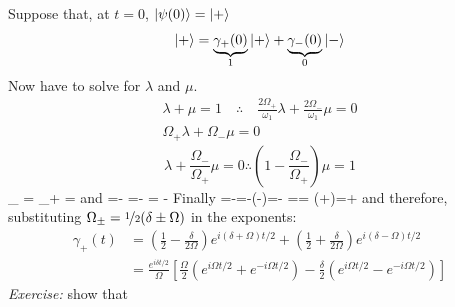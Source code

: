\documentclass[12pt]{article}
\begin{document}
Suppose that, at $t=0$, $\ket{\psi(0)} = \ket{+}$
\[
\ket{+}=
\underbrace{\gamma_+(0)}_{1} \ket{+}+ 
\underbrace{\gamma_-(0)}_{0} \ket{-} 
\]
Now have to solve for $\lambda$ and $\mu$.
\[
\begin{gathered}
\lambda+\mu=1 \quad \therefore \quad \frac{2 \Omega_{+}}{\omega_{1}} \lambda+\frac{2 \Omega_-}{\omega_{1}} \mu=0\\
\Omega_+\lambda+\Omega_-\mu=0
\end{gathered}
\]
\[
\lambda+\frac{\Omega_{-}}{\Omega_{+}} \mu=0 
\therefore\left(1-\frac{\Omega_{-}}{\Omega_{+}}\right) \mu=1
\]
\be
\underbrace{(\Omega_{+} - \Omega_{-})}%
_{\Omega}
\mu = \Omega_{+}
\therefore
\mu = \frac{\Omega_{+}}{\Omega}
\ee
and
\be
\lambda=-\frac{\Omega_{-}}{\Omega_{+}} \mu=-\frac{\Omega_{-}}{\Omega_{+}} \frac{\Omega_{+}}{\Omega}=
- \frac{\Omega_{-}}{\Omega}
\ee
Finally
\be
\lambda=-\frac{\Omega_{-}}{\Omega}=-(\delta-\Omega)=-\frac{\delta}{2 \Omega}
\ee
\be
\mu    =\frac{\Omega_{+}}{\Omega}= (\delta+\Omega)=+\frac{\delta}{2 \Omega}
\ee
and therefore, substituting $\Omega_\pm = \nicefrac{1}{2}(\delta \pm \Omega)$ in the exponents: 
\[
\begin{aligned}
\gamma_{+}(t)
&=\left(\frac{1}{2}-\frac{\delta}{2 \Omega}\right) e^{i(\delta+\Omega) t / 2}+\left(\frac{1}{2}+\frac{\delta}{2 \Omega}\right) e^{i(\delta-\Omega) t / 2}\\
&=\frac{e^{i \delta t / 2}}{\Omega}\left[\frac{\Omega}{2}\left(e^{i \Omega t / 2}+e^{-i \Omega t / 2}\right)
-
\frac{\delta}{2}\left(e^{i \Omega t / 2}-e^{-i \Omega t / 2}\right)\right]
\end{aligned}
\]
\be
{}
\ee
\emph{Exercise:} show that
\be
{}
\ee
\end{document}
